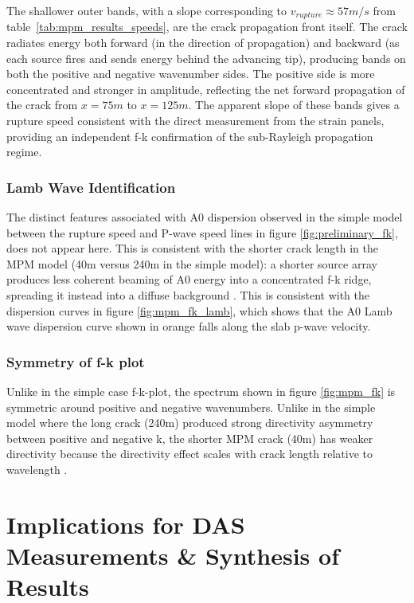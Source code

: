 The shallower outer bands, with a slope corresponding to
$v_{rupture} \approx 57m/s$ from table~\ref{tab:mpm_results_speeds}, are the crack propagation front itself. The crack radiates energy both forward
(in the direction of propagation) and backward (as each source fires and
sends energy behind the advancing tip), producing bands on both the
positive and negative wavenumber sides. The positive side is more
concentrated and stronger in amplitude, reflecting the net forward
propagation of the crack from $x = 75m$ to $x = 125m$. The apparent
slope of these bands gives a rupture speed consistent with the direct
measurement from the strain panels, providing an independent f-k
confirmation of the sub-Rayleigh propagation regime. \par

\subsubsection{Lamb Wave Identification}

The distinct features associated with A0 dispersion observed in the simple model between the rupture speed and P-wave speed
lines in figure \ref{fig:preliminary_fk}, does not appear here. This is consistent with the shorter crack length in the MPM model (40m versus 240m in the simple model): a shorter source array produces less coherent beaming of A0 energy into a concentrated f-k ridge, spreading it instead into a diffuse background \parencite{roseWavesPlates2014}. This is consistent with the dispersion curves in figure \ref{fig:mpm_fk_lamb}, which shows that the A0 Lamb wave dispersion curve shown in orange falls along the slab p-wave velocity. \par

\subsubsection{Symmetry of f-k plot}

Unlike in the simple case f-k-plot, the spectrum shown in figure \ref{fig:mpm_fk} is symmetric around positive and negative wavenumbers. Unlike in the simple model where the long crack (240m)
produced strong directivity asymmetry between positive and negative k,
the shorter MPM crack (40m) has weaker directivity because the
directivity effect scales with crack length relative to wavelength \parencite{madariagaDynamicsExpandingCircular1976}. \par 

\section{Implications for DAS Measurements \& Synthesis of Results}


